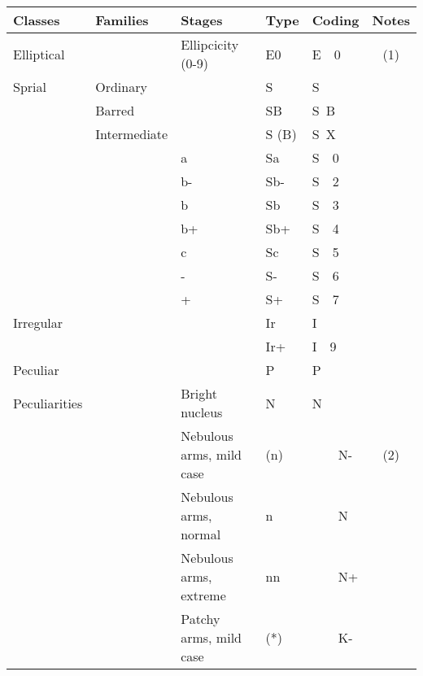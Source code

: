 \begin{center}
\begin{tabular}{l|l|l|l|lc}
\hline
Classes   & Families    & Stages                  & Type  &Coding    & Notes \\
\hline
Elliptical&             & Ellipcicity (0-9)       & E0    &E~~0      & (1)   \\
\hline
Sprial    & Ordinary    &                         & S     &S         &       \\
          & Barred      &                         & SB    &S~B       &       \\
          & Intermediate&                         & S (B) &S~X       &       \\
          &             & a                       & Sa    &S~~0      &       \\
          &             & b-                      & Sb-   &S~~2      &       \\
          &             & b                       & Sb    &S~~3      &       \\
          &             & b+                      & Sb+   &S~~4      &       \\
          &             & c                       & Sc    &S~~5      &       \\
          &             & -                       & S-    &S~~6      &       \\
          &             & +                       & S+    &S~~7      &       \\
\hline
Irregular &             &                         & Ir    &I         &       \\
          &             &                         & Ir+   &I~~9      &       \\
\hline
Peculiar  &             &                         & P     &P         &       \\
Peculiarities&          & Bright nucleus          & N     &N         &       \\
          &             & Nebulous arms, mild case& (n)   &~~~~N-    & (2)   \\
          &             & Nebulous arms, normal   & n     &~~~~N     &       \\
          &             & Nebulous arms, extreme  & nn    &~~~~N+    &       \\
          &             & Patchy arms, mild case  & (*)   &~~~~K-    &       \\

\end{tabular}
\end{center}
